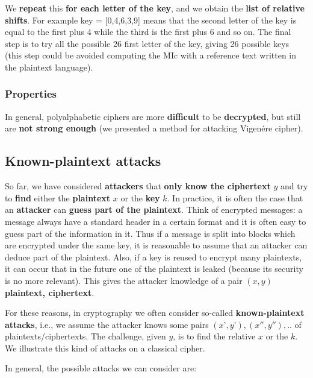 We \textbf{repeat} this \textbf{for each letter of the key}, and we obtain the \textbf{list of relative shifts}. For example key = [0,4,6,3,9] means that the second letter of the key is equal to the first plus 4 while the third is the first plus 6 and so on. The final step is to try all the possible 26 first letter of the key, giving 26 possible keys (this step could be avoided computing the MIc with a reference text written in the plaintext language).

\subsubsection{Properties}
In general, polyalphabetic ciphers are more \textbf{difficult} to be \textbf{decrypted}, but still are \textbf{not strong enough} (we presented a method for attacking Vigenére cipher).

\subsection{Known-plaintext attacks}
So far, we have considered \textbf{attackers} that \textbf{only know the ciphertext} $y$ and try to \textbf{find} either the \textbf{plaintext} $x$ or the \textbf{key} $k$. In practice, it is often the case that an \textbf{attacker} can \textbf{guess part of the plaintext}. Think of encrypted messages: a message always have a standard header in a certain format and it is often easy to guess part of the information in it. Thus if a message is split into blocks which are encrypted under the same key, it is reasonable to assume that an attacker can deduce part of the plaintext. Also, if a key is reused to encrypt many plaintexts, it can occur that in the future one of the plaintext is leaked (because its security is no more relevant). This gives the attacker knowledge of a pair $(x,y)$ \textbf{plaintext, ciphertext}.

For these reasons, in cryptography we often consider so-called \textbf{known-plaintext attacks}, i.e., we assume the attacker knows some pairs $(x’,y’), (x'',y''), ..$ of plaintexts/ciphertexts. The challenge, given $y$, is to find the relative $x$ or the $k$. We illustrate this kind of attacks on a classical cipher.

In general, the possible attacks we can consider are:

